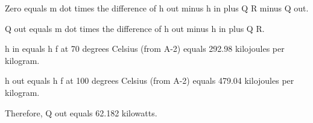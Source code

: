 Zero equals m dot times the difference of h out minus h in plus Q R minus Q out.  

Q out equals m dot times the difference of h out minus h in plus Q R.  

h in equals h f at 70 degrees Celsius (from A-2) equals 292.98 kilojoules per kilogram.  

h out equals h f at 100 degrees Celsius (from A-2) equals 479.04 kilojoules per kilogram.  

Therefore, Q out equals 62.182 kilowatts.